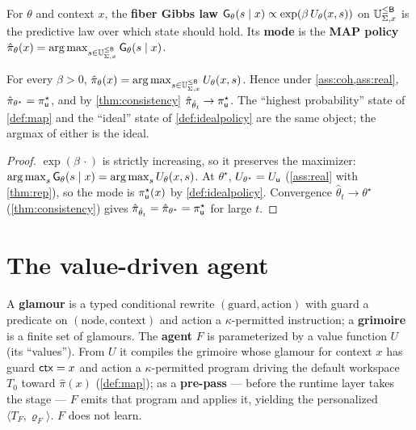 \documentclass[../uxoxo-main]{subfiles}
\begin{document}
\begin{definition}\label{def:map}
For $\theta$ and context $x$, the \textbf{fiber Gibbs law}
$\mathsf{G}_\theta(s\mid x)\propto\exp(\beta\,U_\theta(x,s))$ on $\mathbb{U}_{\Sigma,x}^{\le \mathsf{B}}$ is the
predictive law over which state should hold. Its \textbf{mode} is the
\textbf{MAP policy} $\hat\pi_\theta(x)=\operatorname*{arg\,max}_{s\in\mathbb{U}_{\Sigma,x}^{\le \mathsf{B}}}\mathsf{G}_\theta(s\mid x)$.
\end{definition}

\begin{proposition}[Mode $=$ utility-argmax $=$ ideal at $\theta^\star$]\label{prop:map}
For every $\beta>0$, $\hat\pi_\theta(x)=\operatorname*{arg\,max}_{s\in\mathbb{U}_{\Sigma,x}^{\le \mathsf{B}}}U_\theta(x,s)$. Hence
under \cref{ass:coh,ass:real}, $\hat\pi_{\theta^\star}=\pi^\star_{\mathsf{u}}$, and by
\cref{thm:consistency} $\hat\pi_{\hat\theta_t}\to\pi^\star_{\mathsf{u}}$. The ``highest
probability'' state of \cref{def:map} and the ``ideal'' state of
\cref{def:idealpolicy} are the same object; the argmax of either is the ideal.
\end{proposition}

\begin{proof}
$\exp(\beta\,\cdot)$ is strictly increasing, so it preserves the maximizer:
$\operatorname*{arg\,max}_s\mathsf{G}_\theta(s\mid x)=\operatorname*{arg\,max}_s U_\theta(x,s)$. At $\theta^\star$,
$U_{\theta^\star}=U_{\mathsf{u}}$ (\cref{ass:real} with \cref{thm:rep}), so the mode is
$\pi^\star_{\mathsf{u}}(x)$ by \cref{def:idealpolicy}. Convergence
$\hat\theta_t\to\theta^\star$ (\cref{thm:consistency}) gives
$\hat\pi_{\hat\theta_t}=\hat\pi_{\theta^\star}=\pi^\star_{\mathsf{u}}$ for large $t$.
\end{proof}


\section{The value-driven agent}\label{sec:agent}
\begin{definition}\label{def:agent}
A \textbf{glamour} is a typed conditional rewrite $(\text{guard},\text{action})$
with guard a predicate on $(\text{node},\text{context})$ and action a
$\kappa$-permitted instruction; a \textbf{grimoire} is a finite set of glamours.
The \textbf{agent} $F$ is parameterized by a value function $U$ (its ``values'').
From $U$ it compiles the grimoire whose glamour for context $x$ has guard
$\mathsf{ctx}=x$ and action a $\kappa$-permitted program driving the default workspace
$T_0$ toward $\hat\pi(x)$ (\cref{def:map}); as a \textbf{pre-pass} --- before the
runtime layer takes the stage --- $F$ emits that program and applies it, yielding
the personalized $\langle T_F,\varrho_F\rangle$. $F$ does not learn.
\end{definition}
\end{document}
